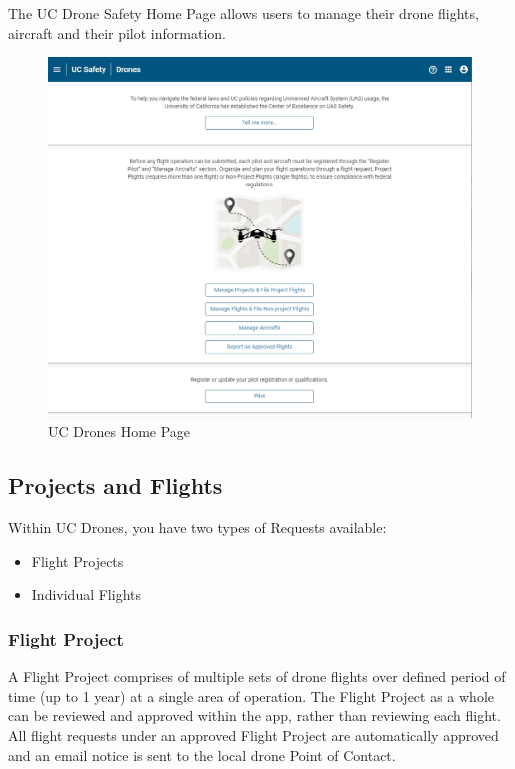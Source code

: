 \documentclass[
  12pt,
]{book}
\providecommand{\tightlist}{%
  \setlength{\itemsep}{0pt}\setlength{\parskip}{0pt}}
\begin{document}
The UC Drone Safety Home Page allows users to manage their drone flights, aircraft and their pilot information.

\begin{figure}

{\centering \includegraphics[width=0.85\linewidth]{images/UCDrones_Home} 

}

\caption{UC Drones Home Page}\label{fig:UCDrones-home}
\end{figure}

\subsection{Projects and Flights}\label{projects-and-flights}

Within UC Drones, you have two types of Requests available:

\begin{itemize}
\tightlist
\item
  Flight Projects
\item
  Individual Flights
\end{itemize}

\subsubsection{Flight Project}\label{flight-project}

A Flight Project comprises of multiple sets of drone flights over defined period of time (up to 1 year) at a single area of operation. The Flight Project as a whole can be reviewed and approved within the app, rather than reviewing each flight. All flight requests under an approved Flight Project are automatically approved and an email notice is sent to the local drone Point of Contact.
\end{document}
